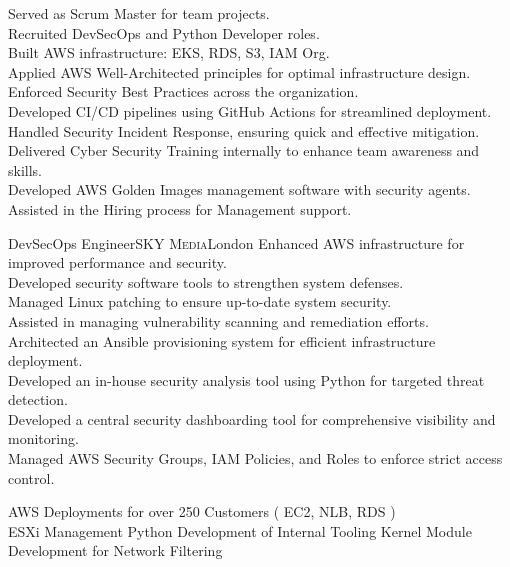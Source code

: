 \documentclass[10pt,a4paper,sans]{moderncv} %
\begin{document}
{
	Served as Scrum Master for team projects.\\
	Recruited DevSecOps and Python Developer roles.\\
	Built AWS infrastructure: EKS, RDS, S3, IAM Org.\\
	Applied AWS Well-Architected principles for optimal infrastructure design.\\
	Enforced Security Best Practices across the organization.\\
	Developed CI/CD pipelines using GitHub Actions for streamlined deployment.\\
	Handled Security Incident Response, ensuring quick and effective mitigation.\\
	Delivered Cyber Security Training internally to enhance team awareness and skills.\\
	Developed AWS Golden Images management software with security agents.\\
	Assisted in the Hiring process for Management support.\\
}

 {DevSecOps Engineer}{\textsc{SKY Media}}{London}{}
{
	Enhanced AWS infrastructure for improved performance and security.\\
	Developed security software tools to strengthen system defenses.\\
	Managed Linux patching to ensure up-to-date system security.\\
	Assisted in managing vulnerability scanning and remediation efforts.\\
	Architected an Ansible provisioning system for efficient infrastructure deployment.\\
	Developed an in-house security analysis tool using Python for targeted threat detection.\\
	Developed a central security dashboarding tool for comprehensive visibility and monitoring.\\
	Managed AWS Security Groups, IAM Policies, and Roles to enforce strict access control.\\
}

{
	AWS Deployments for over 250 Customers ( EC2, NLB, RDS )\\
	ESXi Management
	Python Development of Internal Tooling
	Kernel Module Development for Network Filtering\\
}
\end{document}
